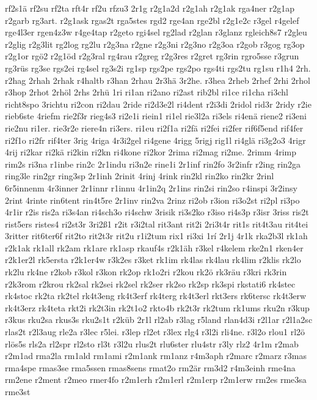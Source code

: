 {rf2s1ä
rf2su
rf2ta
rft4r
rf2u
rfzu3
2r1g
r2g1a2d
r2g1ah
r2g1ak
rga4ner
r2g1ap
r2garb
rg3art.
r2g1ask
rgas2t
rga5stes
rgd2
rge4an
rge2bl
r2g1e2c
r3gel
r4gelef
rge4l3er
rgen4z3w
r4ge4tap
r2geto
rgi4sel
rg2lad
r2glan
r3glanz
rgleich8s7
r2gleu
r2glig
r2g3lit
rg2log
rg2lu
r2g3na
r2gne
r2g3ni
r2g3no
r2g3oa
r2gob
r3gog
rg3op
r2g1or
rgö2
r2g1öd
r2g3ral
rg4rau
r2greg
r2g3res
r2gret
rg3rin
rgro5sse
r3grun
rg3rüs
rg3se
rgs2ei
rg4sel
rg3s2i
rg1sp
rgs2pe
rgs2po
rgs4ti
rgs2tu
rg1su
r1h4
2rh.
r2hag
2rhah
2rhak
r4haltb
r3han
2rhau
2r3hä
3r2he.
r3hea
2rheb
2rhef
2rhi
2rhol
r3hop
2rhot
2rhöl
2rhs
2rhü
1ri
ri1an
ri2ano
ri2ast
rib2bl
ri1ce
ri1cha
ri3chl
richt8spo
3richtu
ri2con
ri2dau
2ride
ri2d3e2l
ri4dent
r2i3di
2ridol
rid3r
2ridy
r2ie
rieb6ste
4riefm
rie2f3r
rieg4s3
ri2e1i
riein1
ri1el
rie3l2a
ri3els
ri4enä
riene2
ri3eni
rie2nu
ri1er.
rie3r2e
riere4n
ri3ers.
ri1eu
ri2f1a
ri2fä
ri2fei
ri2fer
rif6f5end
rif4fer
ri2f1o
ri2fr
rif4ter
3rig
4riga
4r3i2gel
ri4gene
4rigg
5rigj
rig1l
ri4glä
ri3g2o3
4rigr
4rij
ri2kar
ri2kä
ri2kin
ri2kn
ri4kone
ri2kor
2rima
ri2mag
ri2me.
2rimm
4rimp
rim2s
ri3na
r1inbe
rin2c
2r1indu
ri3n2e
rine1i
2r1inf
rin2fo
3r2infr
r2ing
rin2ga
ring3le
rin2gr
ring3sp
2r1inh
2rinit
4rinj
4rink
rin2kl
rin2ko
rin2kr
2rinl
6r5innenm
4r3inner
2r1innr
r1innu
4r1in2q
2r1ins
rin2si
rin2so
r4inspi
3r2insy
2rint
4rinte
rin6tent
rin4t5re
2r1inv
rin2va
2rinz
ri2ob
r3ion
ri3o2st
ri2pl
ri3po
4r1ir
r2is
ris2a
ri3s4an
ri4sch3o
ri4schw
3risik
ri3s2ko
r3iso
ri4s3p
r3isr
3riss
ris2t
rist5ers
ristes4
ri2st3r
3ri2ß1
r2it
r3i2tal
rit3ant
rit2i
2ri3t4r
rit1s
rit4t3au
rit4tei
3ritter
rit6ter6f
rit2to
rit2t3r
rit2u
r1i2tum
rix1
ri3xi
1rí
2r1j
4r1k
rka2b3l
rk1ah
r2k1ak
rk1all
rk2am
rk1are
rk1asp
rkauf4s
r2k1äh
r3kel
r4kelem
rke2n1
rken4er
r2k1er2l
rk5ersta
r2k1er4w
r3k2es
r3ket
rk1im
rk4las
rk4lau
rk4lim
r2klis
rk2lo
rk2lu
rk4ne
r2kob
r3kol
r3kon
rk2op
rk1o2ri
r2kou
rk2ö
rk3räu
r3kri
rk3rin
r2k3rom
r2krou
rk2sal
rk2sei
rk2sel
rk2ser
rk2so
rk2sp
rk3spi
rkstati6
rk4stec
rk4stoc
rk2ta
rk2tel
rk4t3eng
rk4t3erf
rk4terg
rk4t3erl
rkt3ers
rk6tersc
rk4t3erw
rk4t3erz
rk4teta
rkt2i
rk2t3in
rk2t1o2
rkto4b
rk2t3r
rk2tum
rk1ums
rku2n
r3kup
r3kus
rku2sa
rkus3s
rku2s1t
r2küb
2r1l
rl2ab
r3lag
r5land
rlan4d3i
r2l1ar
r2l1a2sc
rlas2t
r2l3aug
rle2a
r3lec
r5lei.
r3lep
rl2et
r3lex
rlg4
r3l2i
rli4ne.
r3l2o
rlou1
rl2ö
rlös5s
rls2a
rl2spr
rl2sto
rl3t
r3l2u
rlus2t
rlu6ster
rlu4str
r3ly
rlz2
4r1m
r2mab
r2m1ad
rma2la
rm1ald
rm1ami
r2m1ank
rm1anz
r4m3aph
r2marc
r2marz
r3mas
rma4spe
rmas3se
rma5ssen
rmas8sens
rmat2o
rm2är
rm3d2
r4m3einh
rme4na
rm2ene
r2ment
r2meo
rmer4fo
r2m1erh
r2m1erl
r2m1erp
r2m1erw
rm2es
rme3sa
rme3st
}
